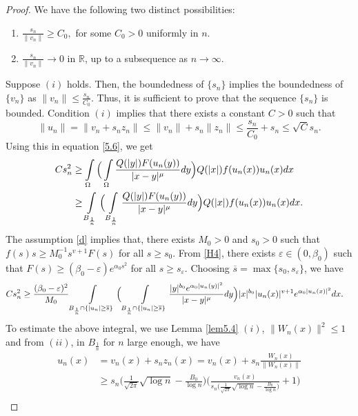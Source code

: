 \documentclass[11pt]{amsart}
\numberwithin{equation}{section}
\newcommand{\R}{\mathbb{R}}
\newcommand{\1}{\frac{1}{2}}
\begin{document}
\begin{proof}
		We have the following two distinct possibilities:
		\begin{enumerate}
			\item [(i)] $\frac{s_n}{\|v_n\|} \geq C_0,$ for some $C_0>0$ uniformly in $n$.
			\item [(ii)] $\frac{s_n}{\|v_n\|} \rightarrow 0$ in $\R$, up to a subsequence as $n \rightarrow \infty$. 
		\end{enumerate}
		Suppose $(i)$ holds. Then, the boundedness of $\{s_n\}$ implies the boundedness of $\{v_n\}$ as $\|v_n\| \leq \frac{s_n}{C_0}.$ Thus, it is sufficient to prove that the sequence $\{s_n\}$ is bounded. Condition $(i)$ implies that there exists a constant $C>0$ such that
		\begin{equation}
			\|u_n\| = \|v_n+s_nz_n\| \leq \|v_n\|+s_n\|z_n\| \leq \frac{s_n}{C_0} + s_n \leq \sqrt{C}s_n. \nonumber
		\end{equation}
		Using this in equation \eqref{5.6}, we get
		\begin{align}
			Cs_n^2 &\geq \int\limits\limits_\Omega \Big( \int\limits\limits_\Omega \frac{Q(|y|)F(u_n(y))}{|x-y|^\mu}dy\Big)Q(|x|)f(u_n(x)) u_n(x)dx \nonumber\\
			& \geq \int\limits\limits_{B_{\frac{1}{n}}} \Big( \int\limits\limits_{B_\frac{1}{n}} \frac{Q(|y|)F(u_n(y))}{|x-y|^\mu}dy\Big) Q(|x|)f(u_n(x))u_n(x)dx. \nonumber
		\end{align}
		The assumption \eqref{d} implies that, there exists $M_0>0$ and $s_0>0$ such that $f(s)s \geq M_0^{-1}s^{v+1} F(s)$ for all $s\geq s_0$. From \eqref{H4}, there exists $\varepsilon \in (0, \beta_0)$ such that $F(s) \geq (\beta_0-\varepsilon)e^{\alpha_0 s^2}$ for all $s \geq s_\varepsilon$. Choosing $\overline{s} = \max\{s_0, s_\varepsilon\}$, we have
		\begin{align}
			Cs_n^2 
			& \geq \frac{ (\beta_0-\varepsilon)^2}{M_0}\int\limits\limits_{B_{\frac{1}{n}} \cap \{ |u_n| \geq \overline{s}\}} \Big( \int\limits\limits_{B_\frac{1}{n} \cap \{ |u_n| \geq \overline{s}\}} \frac{|y|^{b_0}e^{\alpha_0 |u_n(y)|^2}}{|x-y|^\mu} dy\Big) |x|^{b_0}|u_n(x)|^{v+1} e^{\alpha_0 |u_n(x)|^2}dx. \label{5.7}
		\end{align}
		To estimate the above integral, we use Lemma \ref{lem5.4} $(i)$, $\|W_n(x)\|^2 \leq 1$ and from $(ii)$, in $B_{\frac{1}{n}}$ for $n$ large enough, we have
		\begin{align*}
			u_n(x) &= v_n(x) + s_n z_n(x) = v_n(x) + s_n \frac{W_n(x)}{\|W_n(x)\|}\\
			& \geq s_n \Big( \frac{1}{\sqrt{2\pi}}\sqrt{\log{n}} - \frac{B_0}{\log{n}}\Big) \Bigg( \frac{v_n(x)}{s_n\Big(\frac{1}{\sqrt{2\pi}}\sqrt{\log{n}}- \frac{B_0}{\log{n}}\Big)} + 1\Bigg)\\

\end{align*}
\end{proof}
\end{document}

